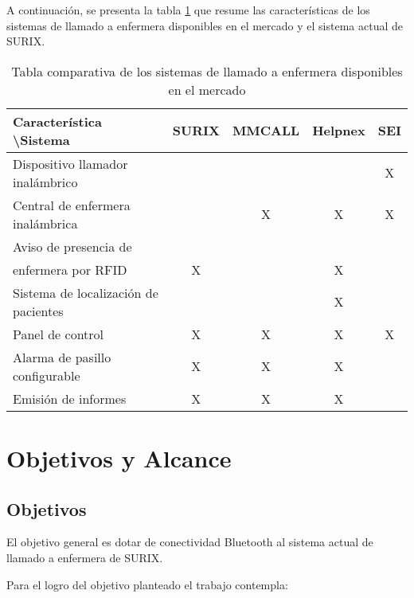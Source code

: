 A continuación, se presenta la tabla \ref{tab:sistemasDeLLamadoEnfermera} que resume las características de los sistemas de llamado a enfermera disponibles en el mercado y el sistema actual de SURIX.

\begin{table}[h]
	\centering
	\caption[Sistemas de llamado a enfermera]{Tabla comparativa de los sistemas de llamado a enfermera disponibles en el mercado}
	\begin{tabular}{l c c c c}    
		\toprule
		\textbf{Característica \textbackslash Sistema} 	 & \textbf{SURIX} & \textbf{MMCALL} & \textbf{Helpnex} & \textbf{SEI}\\
		\midrule
		Dispositivo llamador inalámbrico 				&  	&  	&  	& X \\
		Central de enfermera inalámbrica 				&  	& X & X & X \\
		Aviso de presencia de\\enfermera por RFID 		& X	&  	& X	&   \\
		Sistema de localización de pacientes 			&  	&  	& X	&   \\
		Panel de control 								& X	& X	& X	& X \\
		Alarma de pasillo configurable	 				& X	& X	& X	&   \\
		Emisión de informes				 				& X	& X	& X	&   \\
		\bottomrule
		\hline
	\end{tabular}
	\label{tab:sistemasDeLLamadoEnfermera}
\end{table}



\section{Objetivos y Alcance}

\subsection{Objetivos}

El objetivo general es dotar de conectividad Bluetooth al sistema actual de llamado a enfermera de SURIX.

Para el logro del objetivo planteado el trabajo contempla:

